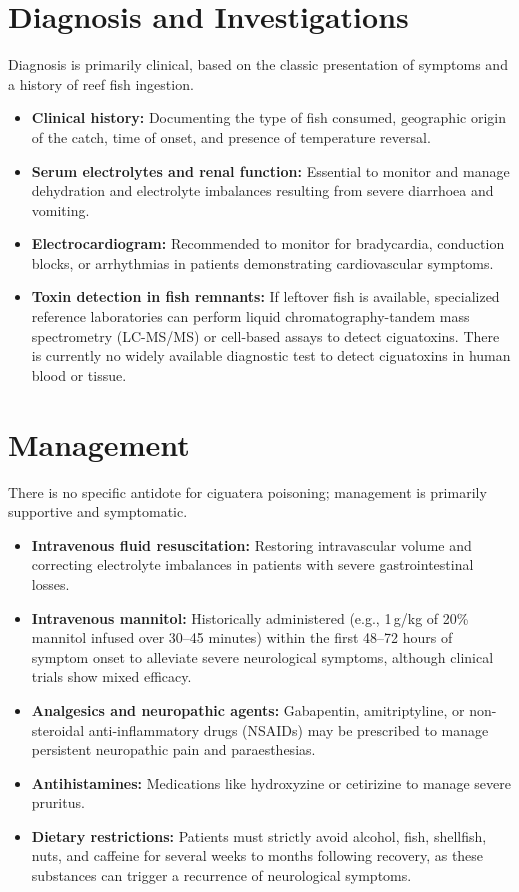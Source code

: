 \section*{Diagnosis and Investigations}
Diagnosis is primarily clinical, based on the classic presentation of symptoms and a history of reef fish ingestion.
\begin{itemize}
    \item \textbf{Clinical history:} Documenting the type of fish consumed, geographic origin of the catch, time of onset, and presence of temperature reversal.
    \item \textbf{Serum electrolytes and renal function:} Essential to monitor and manage dehydration and electrolyte imbalances resulting from severe diarrhoea and vomiting.
    \item \textbf{Electrocardiogram:} Recommended to monitor for bradycardia, conduction blocks, or arrhythmias in patients demonstrating cardiovascular symptoms.
    \item \textbf{Toxin detection in fish remnants:} If leftover fish is available, specialized reference laboratories can perform liquid chromatography-tandem mass spectrometry (LC-MS/MS) or cell-based assays to detect ciguatoxins. There is currently no widely available diagnostic test to detect ciguatoxins in human blood or tissue.
\end{itemize}

\section*{Management}
There is no specific antidote for ciguatera poisoning; management is primarily supportive and symptomatic.
\begin{itemize}
    \item \textbf{Intravenous fluid resuscitation:} Restoring intravascular volume and correcting electrolyte imbalances in patients with severe gastrointestinal losses.
    \item \textbf{Intravenous mannitol:} Historically administered (e.g., 1\,g/kg of 20\% mannitol infused over 30--45 minutes) within the first 48--72 hours of symptom onset to alleviate severe neurological symptoms, although clinical trials show mixed efficacy.
    \item \textbf{Analgesics and neuropathic agents:} Gabapentin, amitriptyline, or non-steroidal anti-inflammatory drugs (NSAIDs) may be prescribed to manage persistent neuropathic pain and paraesthesias.
    \item \textbf{Antihistamines:} Medications like hydroxyzine or cetirizine to manage severe pruritus.
    \item \textbf{Dietary restrictions:} Patients must strictly avoid alcohol, fish, shellfish, nuts, and caffeine for several weeks to months following recovery, as these substances can trigger a recurrence of neurological symptoms.
\end{itemize}

